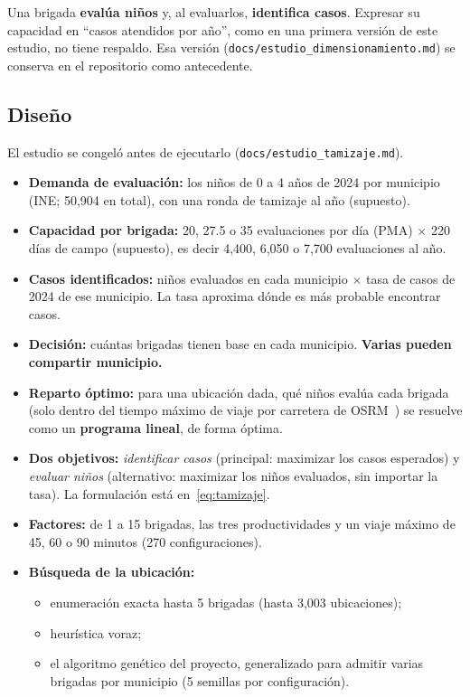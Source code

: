 \documentclass[11pt,letterpaper]{article}
\newcommand{\cod}[1]{\texttt{#1}}
\begin{document}
Una brigada \textbf{evalúa niños} y, al evaluarlos, \textbf{identifica casos}. Expresar su capacidad en ``casos atendidos por año'', como en una primera versión de este estudio, no tiene respaldo. Esa versión (\cod{docs/estudio\_dimensionamiento.md}) se conserva en el repositorio como antecedente.

\subsection{Diseño}

El estudio se congeló antes de ejecutarlo (\cod{docs/estudio\_tamizaje.md}).
\begin{itemize}
  \item \textbf{Demanda de evaluación:} los niños de 0 a 4 años de 2024 por municipio (INE; 50{,}904 en total), con una ronda de tamizaje al año (supuesto).
  \item \textbf{Capacidad por brigada:} 20, 27.5 o 35 evaluaciones por día (PMA) $\times$ 220 días de campo (supuesto), es decir 4{,}400, 6{,}050 o 7{,}700 evaluaciones al año.
  \item \textbf{Casos identificados:} niños evaluados en cada municipio $\times$ tasa de casos de 2024 de ese municipio. La tasa aproxima dónde es más probable encontrar casos.
  \item \textbf{Decisión:} cuántas brigadas tienen base en cada municipio. \textbf{Varias pueden compartir municipio.}
  \item \textbf{Reparto óptimo:} para una ubicación dada, qué niños evalúa cada brigada (solo dentro del tiempo máximo de viaje por carretera de OSRM~\cite{osrm,osm}) se resuelve como un \textbf{programa lineal}, de forma óptima.
  \item \textbf{Dos objetivos:} \emph{identificar casos} (principal: maximizar los casos esperados) y \emph{evaluar niños} (alternativo: maximizar los niños evaluados, sin importar la tasa). La formulación está en~\eqref{eq:tamizaje}.
  \item \textbf{Factores:} de 1 a 15 brigadas, las tres productividades y un viaje máximo de 45, 60 o 90 minutos (270 configuraciones).
  \item \textbf{Búsqueda de la ubicación:}
    \begin{itemize}[nosep]
      \item enumeración exacta hasta 5 brigadas (hasta 3{,}003 ubicaciones);
      \item heurística voraz;
      \item el algoritmo genético del proyecto, generalizado para admitir varias brigadas por municipio (5 semillas por configuración).
    \end{itemize}
\end{itemize}
\end{document}
